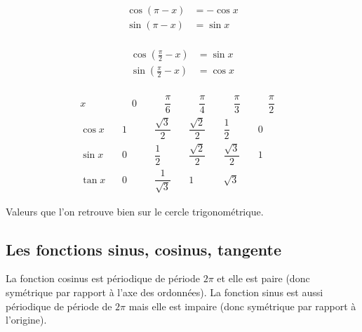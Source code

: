 \documentclass[10pt,class=article,crop=false]{standalone}
\begin{document}
\begin{multicols}{2}
\begin{minipage}{0.25\textwidth}
\end{minipage}	
\begin{minipage}{0.15\textwidth}
	\begin{align*}
		\cos (\pi - x) &= -\cos x \\
		\sin (\pi - x) &= \sin x \\
	\end{align*}
\end{minipage}

\begin{minipage}{0.25\textwidth}
\end{minipage}	
\begin{minipage}{0.15\textwidth}
	\begin{align*}
		\cos (\frac\pi2 - x) &= \sin x \\
		\sin (\frac\pi2 - x) &= \cos x \\
	\end{align*}
\end{minipage}



{
	\renewcommand{\arraystretch}{2}
	$$
	\begin{array}{c|*{5}{c}}
		x     & \quad 0 \quad & \quad \dfrac\pi6 \quad & \quad \dfrac\pi 4\quad
		& \quad \dfrac \pi 3\quad  &\quad  \dfrac \pi 2\quad  \\
		\hline
		\cos x  \quad & 1 & \dfrac{\sqrt3}{2} & \dfrac{\sqrt2}{2} & \dfrac12 & 0 \\
		\hline
		\sin x  \quad & 0 &\dfrac12 & \dfrac{\sqrt2}{2} & \dfrac{\sqrt3}{2} & 1\\
		\hline
		\tan x  \ & 0 & \dfrac{1}{\sqrt{3}} & 1 & \sqrt{3} &
	\end{array}
	$$
}

Valeurs que l'on retrouve bien sur le cercle trigonométrique.

\subsection{Les fonctions sinus, cosinus, tangente}

La fonction cosinus est périodique de période $2\pi$
et elle est paire (donc symétrique par rapport à l'axe des ordonnées).
La fonction sinus est aussi périodique de période de $2\pi$ mais elle est impaire
(donc symétrique par rapport à l'origine).




\end{multicols}
\end{document}
